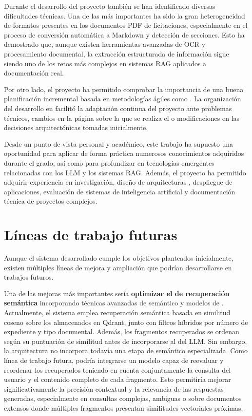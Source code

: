 Durante el desarrollo del proyecto también se han identificado diversas dificultades técnicas. Una de las más importantes ha sido la gran heterogeneidad de formatos presentes en los documentos PDF de licitaciones, especialmente en el proceso de conversión automática a Markdown y detección de secciones. Esto ha demostrado que, aunque existen herramientas avanzadas de OCR y procesamiento documental, la extracción estructurada de información sigue siendo uno de los retos más complejos en sistemas RAG aplicados a documentación real.

Por otro lado, el proyecto ha permitido comprobar la importancia de una buena planificación incremental basada en metodologías ágiles como . La organización del desarrollo en  facilitó la adaptación continua del proyecto ante problemas técnicos, cambios en la página sobre la que se realiza el  o modificaciones en las decisiones arquitectónicas tomadas inicialmente.

Desde un punto de vista personal y académico, este trabajo ha supuesto una oportunidad para aplicar de forma práctica numerosos conocimientos adquiridos durante el grado, así como para profundizar en tecnologías emergentes relacionadas con los LLM y los sistemas RAG. Además, el proyecto ha permitido adquirir experiencia en investigación, diseño de arquitecturas , despliegue de aplicaciones, evaluación de sistemas de inteligencia artificial y documentación técnica de proyectos complejos.

\section{Líneas de trabajo futuras}

Aunque el sistema desarrollado cumple los objetivos planteados inicialmente, existen múltiples líneas de mejora y ampliación que podrían desarrollarse en trabajos futuros.

Una de las mejoras más importantes sería \textbf{optimizar el  de recuperación semántica} incorporando técnicas avanzadas de  semántico y modelos de . Actualmente, el sistema emplea recuperación semántica basada en similitud coseno sobre los  almacenados en Qdrant, junto con filtros híbridos por número de expediente y tipo documental. Además, los fragmentos recuperados se ordenan según su puntuación de similitud antes de incorporarse al  del LLM. Sin embargo, la arquitectura no incorpora todavía una etapa de  semántico especializada. Como línea de trabajo futura, podría integrarse un modelo  capaz de reevaluar y reordenar los  recuperados teniendo en cuenta conjuntamente la consulta del usuario y el contenido completo de cada fragmento. Esto permitiría mejorar significativamente la precisión contextual y la relevancia de las respuestas generadas, especialmente en consultas complejas, ambiguas o sobre documentos extensos donde múltiples fragmentos presentan similitudes vectoriales próximas.


